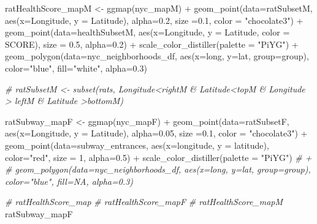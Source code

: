 \documentclass[
]{article}
\newenvironment{Shaded}{\begin{snugshade}}{\end{snugshade}}
\newcommand{\AttributeTok}[1]{\textcolor[rgb]{0.77,0.63,0.00}{#1}}
\newcommand{\CommentTok}[1]{\textcolor[rgb]{0.56,0.35,0.01}{\textit{#1}}}
\newcommand{\DecValTok}[1]{\textcolor[rgb]{0.00,0.00,0.81}{#1}}
\newcommand{\FloatTok}[1]{\textcolor[rgb]{0.00,0.00,0.81}{#1}}
\newcommand{\FunctionTok}[1]{\textcolor[rgb]{0.00,0.00,0.00}{#1}}
\newcommand{\NormalTok}[1]{#1}
\newcommand{\OtherTok}[1]{\textcolor[rgb]{0.56,0.35,0.01}{#1}}
\newcommand{\SpecialCharTok}[1]{\textcolor[rgb]{0.00,0.00,0.00}{#1}}
\newcommand{\StringTok}[1]{\textcolor[rgb]{0.31,0.60,0.02}{#1}}
\begin{document}
\begin{Shaded}
\begin{Highlighting}[]
\NormalTok{ratHealthScore\_mapM }\OtherTok{\textless{}{-}} \FunctionTok{ggmap}\NormalTok{(nyc\_mapM) }\SpecialCharTok{+}
  \FunctionTok{geom\_point}\NormalTok{(}\AttributeTok{data=}\NormalTok{ratSubsetM, }\FunctionTok{aes}\NormalTok{(}\AttributeTok{x=}\NormalTok{Longitude, }\AttributeTok{y =}\NormalTok{ Latitude), }\AttributeTok{alpha=}\FloatTok{0.2}\NormalTok{, }\AttributeTok{size =}\FloatTok{0.1}\NormalTok{, }\AttributeTok{color =} \StringTok{"chocolate3"}\NormalTok{) }\SpecialCharTok{+}
  \FunctionTok{geom\_point}\NormalTok{(}\AttributeTok{data=}\NormalTok{healthSubsetM, }\FunctionTok{aes}\NormalTok{(}\AttributeTok{x=}\NormalTok{Longitude, }\AttributeTok{y =}\NormalTok{ Latitude, }\AttributeTok{color =}\NormalTok{ SCORE), }\AttributeTok{size =} \FloatTok{0.5}\NormalTok{, }\AttributeTok{alpha=}\FloatTok{0.2}\NormalTok{) }\SpecialCharTok{+} 
  \FunctionTok{scale\_color\_distiller}\NormalTok{(}\AttributeTok{palette =} \StringTok{"PiYG"}\NormalTok{) }\SpecialCharTok{+} 
  \FunctionTok{geom\_polygon}\NormalTok{(}\AttributeTok{data=}\NormalTok{nyc\_neighborhoods\_df, }\FunctionTok{aes}\NormalTok{(}\AttributeTok{x=}\NormalTok{long, }\AttributeTok{y=}\NormalTok{lat, }\AttributeTok{group=}\NormalTok{group), }\AttributeTok{color=}\StringTok{"blue"}\NormalTok{, }\AttributeTok{fill=}\StringTok{"white"}\NormalTok{, }\AttributeTok{alpha=}\FloatTok{0.3}\NormalTok{)}
\end{Highlighting}
\end{Shaded}

\begin{Shaded}
\begin{Highlighting}[]
\CommentTok{\# ratSubsetM \textless{}{-} subset(rats, Longitude\textless{}rightM \& Latitude\textless{}topM \& Longitude \textgreater{} leftM \& Latitude \textgreater{}bottomM)}

\NormalTok{ratSubway\_mapF }\OtherTok{\textless{}{-}} \FunctionTok{ggmap}\NormalTok{(nyc\_mapF) }\SpecialCharTok{+}
  \FunctionTok{geom\_point}\NormalTok{(}\AttributeTok{data=}\NormalTok{ratSubsetF, }\FunctionTok{aes}\NormalTok{(}\AttributeTok{x=}\NormalTok{Longitude, }\AttributeTok{y =}\NormalTok{ Latitude), }\AttributeTok{alpha=}\FloatTok{0.05}\NormalTok{, }\AttributeTok{size =}\FloatTok{0.1}\NormalTok{, }\AttributeTok{color =} \StringTok{"chocolate3"}\NormalTok{) }\SpecialCharTok{+}
  \FunctionTok{geom\_point}\NormalTok{(}\AttributeTok{data=}\NormalTok{subway\_entrances, }\FunctionTok{aes}\NormalTok{(}\AttributeTok{x=}\NormalTok{longitude, }\AttributeTok{y =}\NormalTok{ latitude), }\AttributeTok{color=}\StringTok{"red"}\NormalTok{,  }\AttributeTok{size =} \DecValTok{1}\NormalTok{, }\AttributeTok{alpha=}\FloatTok{0.5}\NormalTok{) }\SpecialCharTok{+} 
  \FunctionTok{scale\_color\_distiller}\NormalTok{(}\AttributeTok{palette =} \StringTok{"PiYG"}\NormalTok{) }\CommentTok{\# + }
  \CommentTok{\# geom\_polygon(data=nyc\_neighborhoods\_df, aes(x=long, y=lat, group=group), color="blue", fill=NA, alpha=0.3)}

\CommentTok{\# ratHealthScore\_map}
\CommentTok{\# ratHealthScore\_mapF}
\CommentTok{\# ratHealthScore\_mapM}
\NormalTok{ratSubway\_mapF}
\end{Highlighting}
\end{Shaded}
\end{document}
